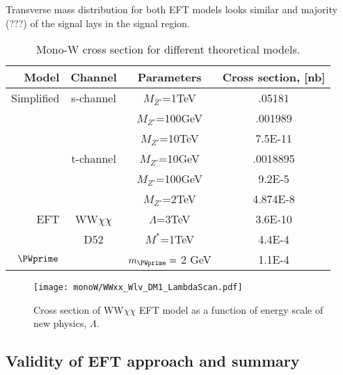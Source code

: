 Transverse mass distribution for both EFT models looks similar and majority (???) of the signal lays in the signal region. 


\begin{table}[tp]
  \begin{tabular}{r|c|c|c}
    Model 	& Channel 	  & Parameters	    & Cross section, [nb] \\
    \midrule
    Simplified  & s-channel	  & $M_{Z'}$=1TeV    & .05181 \\
		&		  & $M_{Z'}$=100GeV  & .001989 \\
		&		  & $M_{Z'}$=10TeV   & 7.5E-11 \\
		& t-channel	  & $M_{Z'}$=10GeV   & .0018895 \\
		&		  & $M_{Z'}$=100GeV  & 9.2E-5 \\
		&		  & $M_{Z'}$=2TeV    & 4.874E-8 \\
    \midrule
EFT 	& WW$\chi\chi$	  & $\Lambda$=3TeV    & 3.6E-10 \\
	& D52		  & $M^{*}$=1TeV	& 4.4E-4 \\
    \midrule	
$\PWprime$ 	& 	  & $m_{\PWprime} =$ 2 GeV   & 1.1E-4 \\    
  \end{tabular}
  \caption{Mono-W cross section for different theoretical models.}
  \label{tab:TriggerDetails}
\end{table}


\begin{figure}[hb]
 \texttt{[image: monoW/WWxx\_Wlv\_DM1\_LambdaScan.pdf]}
  \caption{Cross section of WW$\chi\chi$ EFT model as a function of energy scale of new physics, $\Lambda$.}
  \label{fig:lambdaScan}
\end{figure}

\subsection{Validity of EFT approach and summary}


